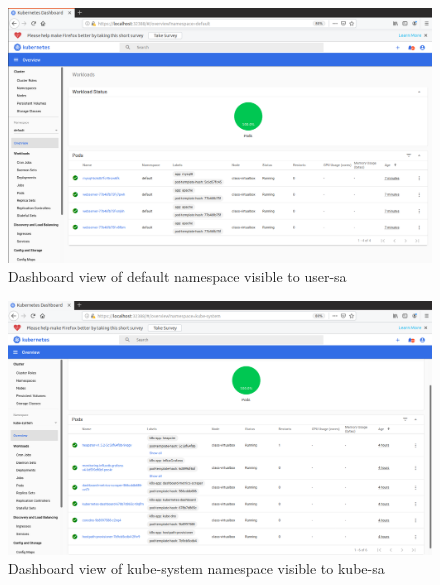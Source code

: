 \documentclass[11pt]{article}
\begin{document}
\begin{figure}[htbp]
  \centering
  \includegraphics[width=1\linewidth]{./def_dash.png}
  \caption{\label{fig:def_dash}
  Dashboard view of default namespace visible to user-sa}
\end{figure}
\begin{figure}[htbp]
  \centering
  \includegraphics[width=1\linewidth]{./kube_dash.png}
  \caption{\label{fig:kube_dash}
  Dashboard view of kube-system namespace visible to kube-sa}
\end{figure}




\end{document}
